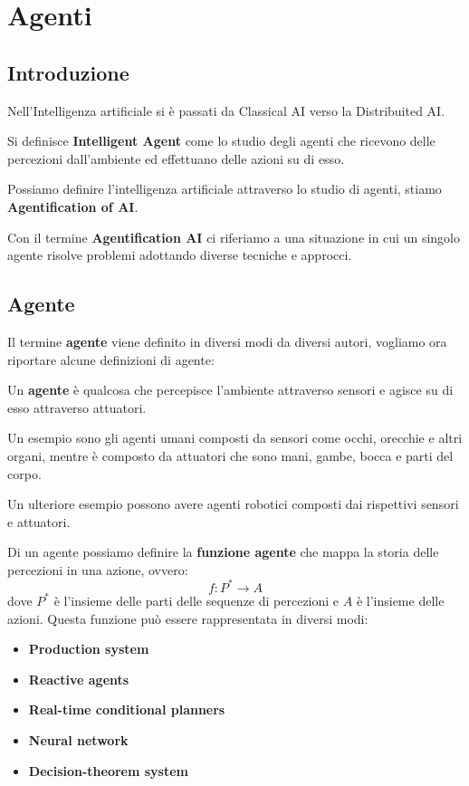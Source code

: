 \chapter{Agenti}
\section{Introduzione}
Nell'Intelligenza artificiale si è passati da Classical AI verso la Distribuited
AI.
\begin{definizione}
    Si definisce \textbf{Intelligent Agent} come lo studio degli agenti che
    ricevono delle percezioni dall'ambiente ed effettuano delle azioni su di esso.
\end{definizione}
Possiamo definire l'intelligenza artificiale attraverso lo studio di agenti,
stiamo \textbf{Agentification of AI}.
\begin{definizione}
    Con il termine \textbf{Agentification AI} ci riferiamo a una situazione in
    cui un singolo agente risolve problemi adottando diverse tecniche e approcci.
\end{definizione}
\section{Agente}
Il termine \textbf{agente} viene definito in diversi modi da diversi autori,
vogliamo ora riportare alcune definizioni di agente:
\begin{definizione}
    Un \textbf{agente} è qualcosa che percepisce l'ambiente attraverso sensori e
    agisce su di esso attraverso attuatori.
\end{definizione}
\begin{esempio}
    Un esempio sono gli agenti umani composti da sensori come occhi, orecchie e
    altri organi, mentre è composto da attuatori che sono mani, gambe, bocca e
    parti del corpo.

    Un ulteriore esempio possono avere agenti robotici composti dai rispettivi
    sensori e attuatori.
\end{esempio}

Di un agente possiamo definire la \textbf{funzione agente} che mappa la storia
delle percezioni in una azione, ovvero:
\begin{equation}
    f: P^* \rightarrow A
\end{equation}
dove $P^*$ è l'insieme delle parti delle sequenze di percezioni e $A$ è l'insieme
delle azioni. Questa funzione può essere rappresentata in diversi modi:
\begin{itemize}
    \item \textbf{Production system}
    \item \textbf{Reactive agents}
    \item \textbf{Real-time conditional planners}
    \item \textbf{Neural network}
    \item \textbf{Decision-theorem system}
\end{itemize}

